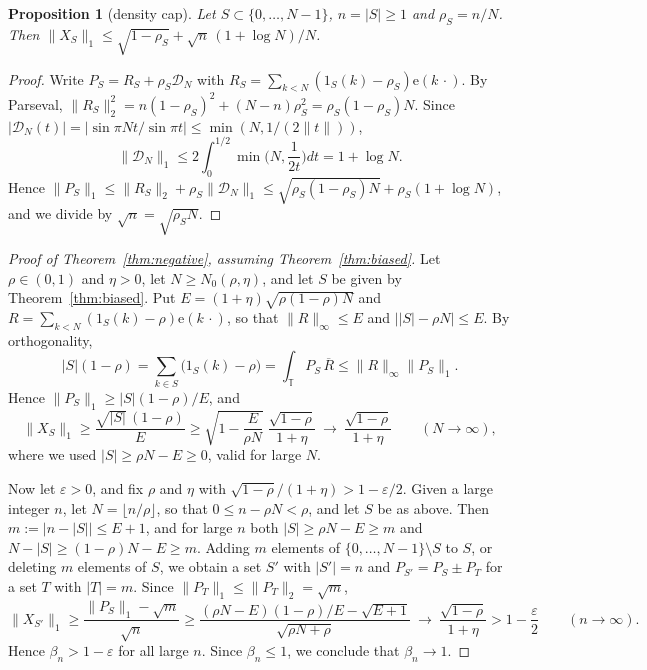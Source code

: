 \documentclass[11pt,reqno]{amsart}
\newtheorem{proposition}[theorem]{Proposition}
\theoremstyle{definition}
\newcommand{\T}{\mathbb{T}}
\newcommand{\e}{\mathrm{e}}
\newcommand{\cD}{\mathcal{D}}
\begin{document}
\begin{proposition}[density cap]\label{prop:densitycap}
Let $S\subset\{0,\dots,N-1\}$, $n=|S|\ge1$ and $\rho_S=n/N$. Then $\|X_S\|_1\le\sqrt{1-\rho_S}+\sqrt n\,(1+\log N)/N$.
\end{proposition}

\begin{proof}
Write $P_S=R_S+\rho_S\cD_N$ with $R_S=\sum_{k<N}(1_S(k)-\rho_S)\e(k\,\cdot)$. By Parseval, $\|R_S\|_2^2=n(1-\rho_S)^2+(N-n)\rho_S^2=\rho_S(1-\rho_S)N$. Since $|\cD_N(t)|=|\sin\pi Nt/\sin\pi t|\le\min(N,1/(2\|t\|))$,
\[
\|\cD_N\|_1\le2\int_0^{1/2}\min\Big(N,\frac1{2t}\Big)dt=1+\log N .
\]
Hence $\|P_S\|_1\le\|R_S\|_2+\rho_S\|\cD_N\|_1\le\sqrt{\rho_S(1-\rho_S)N}+\rho_S(1+\log N)$, and we divide by $\sqrt n=\sqrt{\rho_SN}$.
\end{proof}

\begin{proof}[Proof of Theorem~\ref{thm:negative}, assuming Theorem~\ref{thm:biased}]
Let $\rho\in(0,1)$ and $\eta>0$, let $N\ge N_0(\rho,\eta)$, and let $S$ be given by Theorem~\ref{thm:biased}. Put $E=(1+\eta)\sqrt{\rho(1-\rho)N}$ and $R=\sum_{k<N}(1_S(k)-\rho)\e(k\,\cdot)$, so that $\|R\|_\infty\le E$ and $\big||S|-\rho N\big|\le E$. By orthogonality,
\[
|S|(1-\rho)=\sum_{k\in S}\big(1_S(k)-\rho\big)=\int_\T P_S\,\overline R\le\|R\|_\infty\|P_S\|_1 .
\]
Hence $\|P_S\|_1\ge|S|(1-\rho)/E$, and
\begin{equation}\label{eq:explicit}
\|X_S\|_1\ge\frac{\sqrt{|S|}\,(1-\rho)}{E}\ge\sqrt{1-\frac E{\rho N}}\;\frac{\sqrt{1-\rho}}{1+\eta}\ \longrightarrow\ \frac{\sqrt{1-\rho}}{1+\eta}\qquad(N\to\infty),
\end{equation}
where we used $|S|\ge\rho N-E\ge0$, valid for large $N$.

Now let $\varepsilon>0$, and fix $\rho$ and $\eta$ with $\sqrt{1-\rho}/(1+\eta)>1-\varepsilon/2$. Given a large integer $n$, let $N=\lfloor n/\rho\rfloor$, so that $0\le n-\rho N<\rho$, and let $S$ be as above. Then $m:=\big|n-|S|\big|\le E+1$, and for large $n$ both $|S|\ge\rho N-E\ge m$ and $N-|S|\ge(1-\rho)N-E\ge m$. Adding $m$ elements of $\{0,\dots,N-1\}\setminus S$ to $S$, or deleting $m$ elements of $S$, we obtain a set $S'$ with $|S'|=n$ and $P_{S'}=P_S\pm P_T$ for a set $T$ with $|T|=m$. Since $\|P_T\|_1\le\|P_T\|_2=\sqrt m$,
\[
\|X_{S'}\|_1\ge\frac{\|P_S\|_1-\sqrt m}{\sqrt n}\ge\frac{(\rho N-E)(1-\rho)/E-\sqrt{E+1}}{\sqrt{\rho N+\rho}}\ \longrightarrow\ \frac{\sqrt{1-\rho}}{1+\eta}>1-\frac\varepsilon2\qquad(n\to\infty).
\]
Hence $\beta_n>1-\varepsilon$ for all large $n$. Since $\beta_n\le1$, we conclude that $\beta_n\to1$.
\end{proof}
\end{document}
